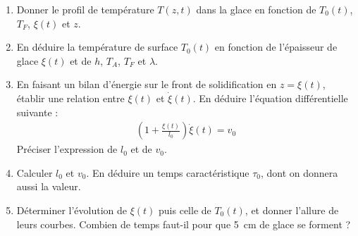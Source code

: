 \begin{enumerate}

	\item Donner le profil de température $T(z,t)$ dans la glace en fonction de $T_0(t)$, $T_F$, $\xi(t)$ et $z$.

	\item En déduire la température de surface $T_0(t)$ en fonction de l'épaisseur de glace $\xi(t)$ et de $h$, $T_A$, $T_F$ et $\lambda$.

	\item En faisant un bilan d'énergie sur le front de solidification en $z=\xi(t)$, établir une relation entre $\xi(t)$ et $\dot{\xi}(t)$. En déduire l'équation différentielle suivante :
	\begin{align*}
		\left( 1+\frac{\xi(t)}{l_0}\right) \dot{\xi}(t)=v_0
	\end{align*}
	Préciser l'expression de $l_0$ et de $v_0$.

	\item Calculer $l_0$ et $v_0$. En déduire un temps caractéristique $\tau_0$, dont on donnera aussi la valeur.

	\item Déterminer l'évolution de $\xi(t)$ puis celle de $T_0(t)$, et donner l'allure de leurs courbes. Combien de temps faut-il pour que 5~cm de glace se forment ?

\end{enumerate}

\newpage


